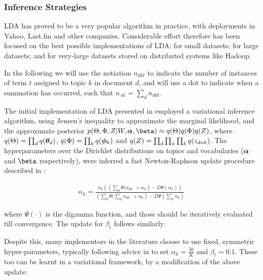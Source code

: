 

\subsubsection{Inference Strategies}
LDA has proved to be a very popular algorithm in practice, with deployments in Yahoo, Last.fm and other companies. Considerable effort therefore has been focused on the best possible implementations of LDA: for small datasets; for large datasets; and for very-large datasets stored on distributed systems like Hadoop.

In the following we will use the notiation $n_{dkt}$ to indicate the number of instances of term $t$ assigned to topic $k$ in document $d$, and will use a dot to indicate when a summation has occurred, such that $n_{\cdot k t} = \sum_d n_{dkt}$.



The initial implementation of LDA presented in \cite{BleiNgJordan2003} employed a variational inference algorithm\cite{Bernardo2003}, using Jensen's inequality to approximate the marginal likelihood, and the approximate posterior $p(\Theta,\Phi,Z|W,\vv{\alpha},\vv{\beta}) \approx q(\Theta)q(\Phi)q(Z) $, where $q(\Theta) = \prod_d q({ \bm \theta_d })$, $q(\Phi) = \prod_k q({ \bm \phi_k })$ and $q(Z) = \prod_d \prod_n \prod_k q({ z_{dnk} })$. The hyperparameters over the Dirichlet distributions on topics and vocabularies ($\bm \alpha$ and $\vv{\beta}$ respectively), were inferred a fast Newton-Raphson update procedure described in \cite{Minka2000}:

\begin{align}
\alpha_k = \frac{\alpha_k \left( \left(\sum_d \Psi(n_{dk\cdot} + \alpha_k \right) - D \Psi (\alpha_k)\right)}{\left(\sum_d  \Psi(\sum_k n_{dk\cdot} + \alpha_k \right) - D \Psi (\sum_k \alpha_k)}
\end{align}

where $\Psi(\cdot)$ is the digamma function, and those should be iteratively evaluated till convergence. The update for $\beta_t$ follows similarly.

Despite this, many implementors in the literature choose to use fixed, symmetric hyper-parameters, typically following advice in \cite{Griffiths2004} to set $\alpha_k = \frac{50}{K}$ and $\beta_t=0.1$. These too can be learnt in a variational framework, by a modification of the above update\cite{Heinrich2005}:

